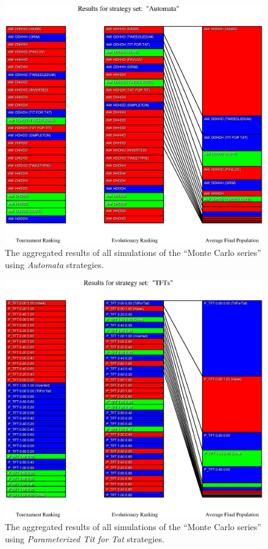 \begin{figure}
\begin{center}
\includegraphics[width=20cm]{tables/Automata_montecarlo.eps}
\caption{\label{Automata_MonteCarlo} The aggregated results of all simulations
of the ``Monte Carlo series'' using {\em Automata} strategies.}
\end{center}
\end{figure}

\begin{figure}
\begin{center}
\includegraphics[width=20cm]{tables/TFTs_overall.eps}
\caption{\label{TFTs_MonteCarlo} The aggregated results of all simulations
of the ``Monte Carlo series'' using {\em Parameterized Tit for Tat}
strategies.}
\end{center}
\end{figure}


